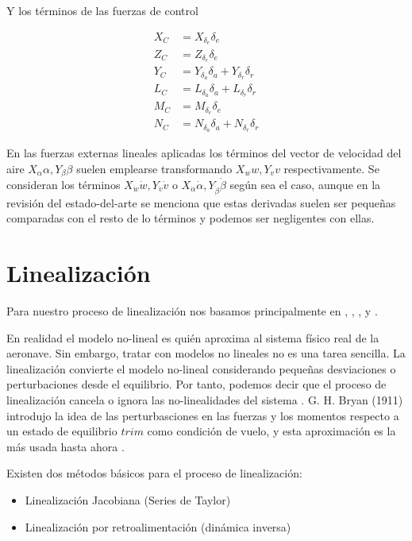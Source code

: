 Y los términos de las fuerzas de control

\begin{align}
    X_C &=  X_{\delta_{e}}\delta_{e} \\
    Z_C &=  Z_{\delta_{e}}\delta_{e} \\
    Y_C &=  Y_{\delta_{a}}\delta_{a} + Y_{\delta_{r}} \delta_{r}\\
    L_C &=  L_{\delta_{a}}\delta_{a} + L_{\delta_{r}} \delta_{r} \\
    M_C &=  M_{\delta_{e}}\delta_{e} \\
    N_C &=  N_{\delta_{a}}\delta_{a} + N_{\delta_{r}} \delta_{r}
\end{align}


En las fuerzas externas lineales aplicadas los términos del vector de velocidad del aire $X_{\alpha} \alpha, Y_{\beta} \beta$ suelen  emplearse transformando $ X_{w} w, Y_{v} v$ respectivamente. Se consideran los términos $ X_{\dot w} \dot w, Y_{\dot v} \dot v$ o $ X_{\dot \alpha} \dot \alpha, Y_{\dot \beta} \dot \beta$ según sea el caso, aunque en la revisión del estado-del-arte se menciona que estas derivadas suelen ser pequeñas comparadas con el resto de lo términos y podemos ser negligentes con ellas. 



\section{Linealización}
\label{linealizacion a}
Para nuestro proceso de linealización nos basamos principalmente en \cite{Etkin1996}, \cite{Lewis2016}, \cite{Schimdt1998}, \cite{USAF1988} y \cite{Mohammad2020}. 


En realidad el modelo no-lineal es quién aproxima al sistema físico real de la aeronave. Sin embargo, tratar con modelos no lineales no es una tarea sencilla. La linealización convierte  el modelo no-lineal considerando pequeñas desviaciones o perturbaciones desde el equilibrio. Por tanto, podemos decir que el proceso de linealización cancela o ignora las no-linealidades del sistema \cite{Mohammad2020}.
G. H. Bryan (1911) introdujo la idea de las perturbasciones en las fuerzas y los momentos respecto a un estado de equilibrio $trim$ como condición de vuelo, y esta aproximación es la más usada hasta ahora \cite{Cook2007}. 


Existen dos métodos básicos para el proceso de linealización: 
\begin{itemize}
    \item Linealización Jacobiana (Series de Taylor)
    \item Linealización por retroalimentación (dinámica inversa)
\end{itemize}

